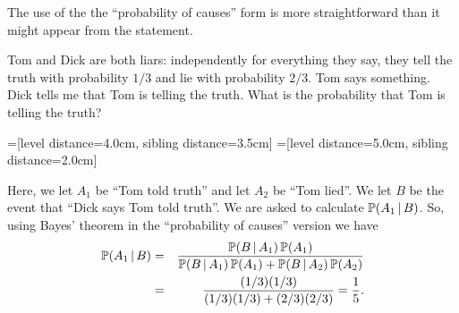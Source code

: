 \begin{example}
The use of the the ``probability of causes'' form is more straightforward than it might appear from the statement. 

Tom and Dick are both liars: independently for everything they say, they tell the truth with probability $1/3$ and lie with probability $2/3$.  Tom says something.  Dick tells me that Tom is telling the truth.  What is the probability that Tom is telling the truth? 


=[level distance=4.0cm, sibling distance=3.5cm]
=[level distance=5.0cm, sibling distance=2.0cm]


Here, we let $A_1$ be ``Tom told truth'' and let $A_2$ be ``Tom lied''.    We let $B$ be the event that ``Dick says Tom told truth''. 
We are asked to calculate ${\mathbb P}( A_1 \, | \, B)$. So, using Bayes' theorem in the ``probability of causes'' version we have 
 \begin{eqnarray*}
   {\mathbb P}( A_1 \, | \, B) &=& 
     \frac{{\mathbb P}(B \, | \, A_1) \, {\mathbb P}(A_1)}
     {  {\mathbb P}(B \, | \, A_1) \,{\mathbb P}(A_1) + {\mathbb P}(B \, | \, A_2)\,
         {\mathbb P}(A_2)   } \\
    &=& \frac{ (1/3)(1/3)}{(1/3)(1/3)+(2/3)(2/3)}  = \frac15. 
 \end{eqnarray*}
\end{example}

